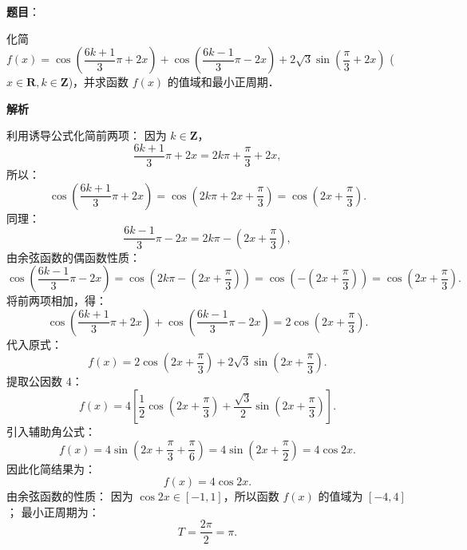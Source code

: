 \begin{answer}

\textbf{题目}：

化简 $f(x) = \cos\left(\dfrac{6k+1}{3}\pi + 2x\right) + \cos\left(\dfrac{6k-1}{3}\pi - 2x\right) + 2\sqrt{3}\sin\left(\dfrac{\pi}{3} + 2x\right)$ ($x \in \mathbf{R}, k \in \mathbf{Z}$)，并求函数 $f(x)$ 的值域和最小正周期．

\textbf{解析}

利用诱导公式化简前两项：
因为 $k \in \mathbf{Z}$，
\nopagebreak[4]
\[
\frac{6k+1}{3}\pi + 2x = 2k\pi + \frac{\pi}{3} + 2x,
\]
所以：
\nopagebreak[4]
\[
\cos\left(\frac{6k+1}{3}\pi + 2x\right) = \cos\left(2k\pi + 2x + \frac{\pi}{3}\right) = \cos\left(2x + \frac{\pi}{3}\right).
\]
同理：
\nopagebreak[4]
\[
\frac{6k-1}{3}\pi - 2x = 2k\pi - \left(2x + \frac{\pi}{3}\right),
\]
由余弦函数的偶函数性质：
\nopagebreak[4]
\[
\cos\left(\frac{6k-1}{3}\pi - 2x\right) = \cos\left(2k\pi - \left(2x + \frac{\pi}{3}\right)\right) = \cos\left(-\left(2x + \frac{\pi}{3}\right)\right) = \cos\left(2x + \frac{\pi}{3}\right).
\]
将前两项相加，得：
\nopagebreak[4]
\[
\cos\left(\frac{6k+1}{3}\pi + 2x\right) + \cos\left(\frac{6k-1}{3}\pi - 2x\right) = 2\cos\left(2x + \frac{\pi}{3}\right).
\]
代入原式：
\nopagebreak[4]
\[
f(x) = 2\cos\left(2x + \frac{\pi}{3}\right) + 2\sqrt{3}\sin\left(2x + \frac{\pi}{3}\right).
\]
提取公因数 4：
\nopagebreak[4]
\[
f(x) = 4\left[\frac{1}{2}\cos\left(2x + \frac{\pi}{3}\right) + \frac{\sqrt{3}}{2}\sin\left(2x + \frac{\pi}{3}\right)\right].
\]
引入辅助角公式：
\nopagebreak[4]
\[
f(x) = 4\sin\left(2x + \frac{\pi}{3} + \frac{\pi}{6}\right) = 4\sin\left(2x + \frac{\pi}{2}\right) = 4\cos 2x.
\]
因此化简结果为：
\nopagebreak[4]
\[
f(x) = 4\cos 2x.
\]
由余弦函数的性质：
因为 $\cos 2x \in [-1, 1]$，所以函数 $f(x)$ 的值域为 $[-4, 4]$；
最小正周期为：
\nopagebreak[4]
\[
T = \frac{2\pi}{2} = \pi.
\]


\end{answer}
